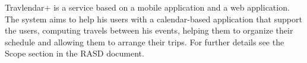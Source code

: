 Travlendar+ is a service based on a mobile application and a web application. The system aims to help his users with a calendar-based application that support the users, computing travels between his events, helping them to organize their schedule and allowing them to arrange their trips. For further details see the Scope section in the RASD document.